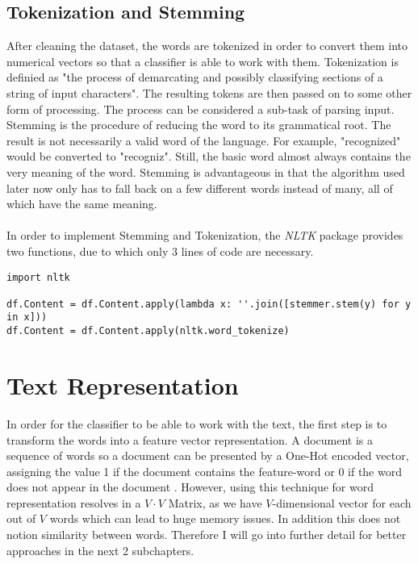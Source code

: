 \documentclass[a4paper, 11pt,titlepage,oneside,openany]{book}
\begin{document}
\subsection{Tokenization and Stemming}
After cleaning the dataset, the words are tokenized in order to convert them into numerical vectors so that a classifier is able to work with them. Tokenization is definied as "the process of demarcating and possibly classifying sections of a string of input characters". The resulting tokens are then passed on to some other form of processing. The process can be considered a sub-task of parsing input.\\
\noindent Stemming is the procedure of reducing the word to its grammatical root. The result is not necessarily a valid word of the language. For example, "recognized" would be converted to "recogniz". Still, the basic word almost always contains the very meaning of the word. Stemming is advantageous in that the algorithm used later now only has to fall back on a few different words instead of many, all of which have the same meaning.\\
\\
\noindent In order to implement Stemming and Tokenization, the \textit{NLTK} \cite{nltk} package provides two functions, due to which only 3 lines of code are necessary.
\begin{lstlisting}[caption=Tokenization and Stemming]
import nltk

df.Content = df.Content.apply(lambda x: ''.join([stemmer.stem(y) for y in x]))
df.Content = df.Content.apply(nltk.word_tokenize)
\end{lstlisting}

\section{Text Representation}
In order for the classifier to be able to work with the text, the first step is to transform the words into a feature vector representation. A document is a sequence of words \cite{word2vecdortmund} so a document can be presented by a One-Hot encoded vector, assigning the value 1 if the document contains the feature-word or 0 if the word does not appear in the document \cite{textclassification}. However, using this technique for word representation resolves in a $V \cdot V$ Matrix, as we have $V$-dimensional vector for each out of $V$ words which can lead to huge memory issues. In addition this does not notion similarity between words. Therefore I will go into further detail for better approaches in the next 2 subchapters.
\end{document}
